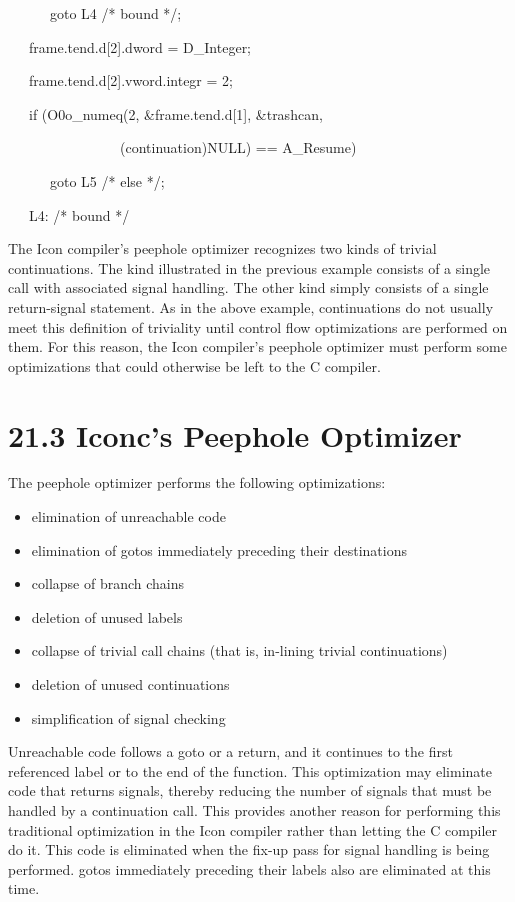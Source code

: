 {\ttfamily\mdseries
\ \ \ \ \ \ goto L4 /* bound */;}

{\ttfamily\mdseries
\ \ \ frame.tend.d[2].dword = D\_Integer;}

{\ttfamily\mdseries
\ \ \ frame.tend.d[2].vword.integr = 2;}

{\ttfamily\mdseries
\ \ \ if (O0o\_numeq(2, \&frame.tend.d[1], \&trashcan,}

{\ttfamily\mdseries
\ \ \ \ \ \ \ \ \ \ \ \ \ \ \ \ (continuation)NULL) == A\_Resume)}

{\ttfamily\mdseries
\ \ \ \ \ \ goto L5 /* else */;}

{\ttfamily\mdseries
\ \ \ L4: /* bound */}


The Icon compiler's peephole optimizer recognizes two kinds of trivial
continuations. The kind illustrated in the previous example consists
of a single call with associated signal handling. The other kind
simply consists of a single return-signal statement. As in the above
example, continuations do not usually meet this definition of
triviality until control flow optimizations are performed on them. For
this reason, the Icon compiler's peephole optimizer must perform some
optimizations that could otherwise be left to the C compiler.


\section[21.3 Iconc's Peephole Optimizer]{21.3 Iconc's Peephole Optimizer}

The peephole optimizer performs the following optimizations: 

\liststyleLxxxiv
\begin{itemize}
\item 
elimination of unreachable code 
\item 
elimination of gotos immediately preceding their destinations 
\item 
collapse of branch chains 
\item 
deletion of unused labels 
\item 
collapse of trivial call chains (that is, in-lining trivial continuations) 
\item 
deletion of unused continuations 
\item 
simplification of signal checking 
\end{itemize}

Unreachable code follows a goto or a return, and it continues to the
first referenced label or to the end of the function. This
optimization may eliminate code that returns signals, thereby reducing
the number of signals that must be handled by a continuation
call. This provides another reason for performing this traditional
optimization in the Icon compiler rather than letting the C compiler
do it. This code is eliminated when the fix-up pass for signal
handling is being performed. gotos immediately preceding their labels
also are eliminated at this time.

